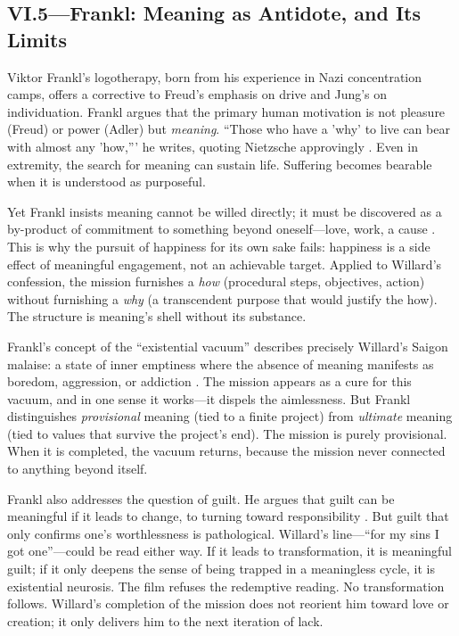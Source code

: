 \subsection*{VI.5—Frankl: Meaning as Antidote, and Its Limits}
\label{ssec:vi-frankl}

Viktor Frankl's logotherapy, born from his experience in Nazi concentration camps, offers a
corrective to Freud's emphasis on drive and Jung's on individuation. Frankl argues that the
primary human motivation is not pleasure (Freud) or power (Adler) but \emph{meaning}.
``Those who have a 'why' to live can bear with almost any 'how,''' he writes, quoting
Nietzsche approvingly \parencite[p.~104]{FranklMeaning2006}. Even in extremity, the search
for meaning can sustain life. Suffering becomes bearable when it is understood as purposeful.

Yet Frankl insists meaning cannot be willed directly; it must be discovered as a by-product of
commitment to something beyond oneself---love, work, a cause \parencite[pp.~110--115]{FranklMeaning2006}.
This is why the pursuit of happiness for its own sake fails: happiness is a side effect of
meaningful engagement, not an achievable target. Applied to Willard's confession, the mission
furnishes a \emph{how} (procedural steps, objectives, action) without furnishing a \emph{why}
(a transcendent purpose that would justify the how). The structure is meaning's shell without
its substance.

Frankl's concept of the ``existential vacuum'' describes precisely Willard's Saigon malaise: a
state of inner emptiness where the absence of meaning manifests as boredom, aggression, or
addiction \parencite[pp.~127--129]{FranklMeaning2006}. The mission appears as a cure for this
vacuum, and in one sense it works---it dispels the aimlessness. But Frankl distinguishes
\emph{provisional} meaning (tied to a finite project) from \emph{ultimate} meaning (tied to
values that survive the project's end). The mission is purely provisional. When it is
completed, the vacuum returns, because the mission never connected to anything beyond itself.

Frankl also addresses the question of guilt. He argues that guilt can be meaningful if it
leads to change, to turning toward responsibility \parencite[pp.~131--133]{FranklMeaning2006}.
But guilt that only confirms one's worthlessness is pathological. Willard's line---``for my
sins I got one''---could be read either way. If it leads to transformation, it is meaningful
guilt; if it only deepens the sense of being trapped in a meaningless cycle, it is existential
neurosis. The film refuses the redemptive reading. No transformation follows. Willard's
completion of the mission does not reorient him toward love or creation; it only delivers him
to the next iteration of lack.

